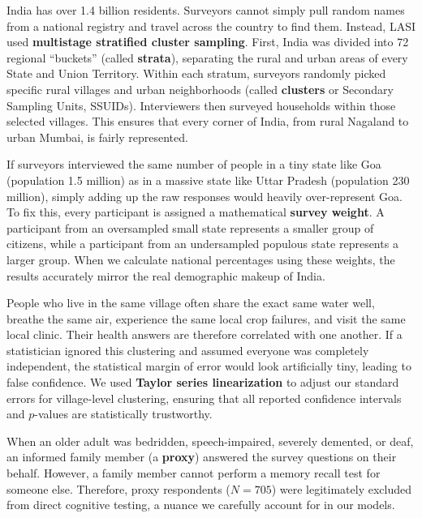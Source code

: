 \begin{description}[leftmargin=0.5cm, style=nextline]
    \item[\textbf{1. Why Not a Simple Random Sample? (Clusters and Strata):}]
    India has over 1.4 billion residents. Surveyors cannot simply pull random names from a national registry and travel across the country to find them. Instead, LASI used \textbf{multistage stratified cluster sampling}. First, India was divided into 72 regional ``buckets'' (called \textbf{strata}), separating the rural and urban areas of every State and Union Territory. Within each stratum, surveyors randomly picked specific rural villages and urban neighborhoods (called \textbf{clusters} or Secondary Sampling Units, SSUIDs). Interviewers then surveyed households within those selected villages. This ensures that every corner of India, from rural Nagaland to urban Mumbai, is fairly represented.

    \item[\textbf{2. Sampling Weights (Making Every Voice Count Proportionally):}]
    If surveyors interviewed the same number of people in a tiny state like Goa (population 1.5 million) as in a massive state like Uttar Pradesh (population 230 million), simply adding up the raw responses would heavily over-represent Goa. To fix this, every participant is assigned a mathematical \textbf{survey weight}. A participant from an oversampled small state represents a smaller group of citizens, while a participant from an undersampled populous state represents a larger group. When we calculate national percentages using these weights, the results accurately mirror the real demographic makeup of India.

    \item[\textbf{3. Cluster-Robust Standard Errors (The ``Neighbor Effect''):}]
    People who live in the same village often share the exact same water well, breathe the same air, experience the same local crop failures, and visit the same local clinic. Their health answers are therefore correlated with one another. If a statistician ignored this clustering and assumed everyone was completely independent, the statistical margin of error would look artificially tiny, leading to false confidence. We used \textbf{Taylor series linearization} to adjust our standard errors for village-level clustering, ensuring that all reported confidence intervals and $p$-values are statistically trustworthy.

    \item[\textbf{4. Proxy Interviews:}]
    When an older adult was bedridden, speech-impaired, severely demented, or deaf, an informed family member (a \textbf{proxy}) answered the survey questions on their behalf. However, a family member cannot perform a memory recall test for someone else. Therefore, proxy respondents ($N=705$) were legitimately excluded from direct cognitive testing, a nuance we carefully account for in our models.
\end{description}

